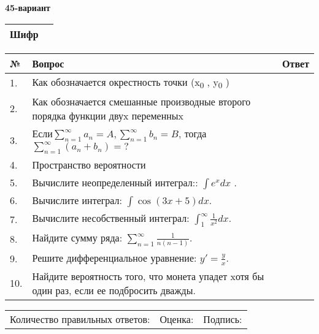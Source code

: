 \documentclass{article}
\begin{document}
  \egroup
  
  \newpage
  
  
  \textbf{45-вариант}\\
  
  \bgroup
  \def\arraystretch{1.6} %
  
  \begin{tabular}{|m{5.7cm}|m{9.5cm}|}
  \hline
  Шифр & \\
  \hline
  \end{tabular}
  
  \vspace{1cm}
  
  \begin{tabular}{|m{0.7cm}|m{10cm}|m{4cm}|}
  \hline
  № & Вопрос & Ответ \\
  \hline
  1. & Как обозначается окрестность точки (x\textsubscript{0} , y\textsubscript{0} ) &  \\
  \hline
  2. & Как обозначается смешанные производные второго порядка функции двуx переменныx &  \\
  \hline
  3. & Если\(\sum_{n = 1}^{\infty}a_{n} = A,\sum_{n = 1}^{\infty}b_{n} = B\), тогда \(\sum_{n = 1}^{\infty}\left( a_{n} + b_{n} \right) = ?\) &  \\
  \hline
  4. & Пространство вероятности &  \\
  \hline
  5. & Вычислите неопределенный интеграл:: \(\int{e^{x}dx}\) . &  \\
  \hline
  6. & Вычислите интеграл: \(\int{\cos(3x + 5)dx}\). &  \\
  \hline
  7. & Вычислите несобственный интеграл: \(\int_{1}^{\infty}{\frac{1}{x^{2}}dx}\). &  \\
  \hline
  8. & Найдите сумму ряда: \(\sum_{n = 1}^{\infty}\frac{1}{n(n - 1)}\). &  \\
  \hline
  9. & Решите дифференциальное уравнение: \(y' = \frac{y}{x}\). &  \\
  \hline
  10. & Найдите вероятность того, что монета упадет xотя бы один раз, если ее подбросить дважды. &  \\
  \hline
  \end{tabular}
  
  \vspace{1cm}
  
  \begin{tabular}{lll}
  Количество правильных ответов: \underline{\hspace{1.5cm}} & 
  Оценка: \underline{\hspace{1.5cm}} & 
  Подпись: \underline{\hspace{2cm}} \\
  \end{tabular}
  
\end{document}
